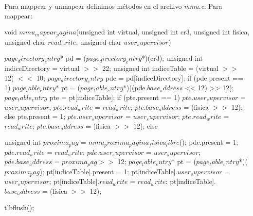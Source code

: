 Para mappear y unmapear definimos m\'etodos en el archivo \textit{mmu.c}.
Para mappear:
\begin{algorithmic}
    \State \tab void $mmu_mapear_pagina$(unsigned int virtual, unsigned int cr3, \State \tab unsigned int fisica, unsigned char $read_write$, unsigned char $user_supervisor$) {

  \State \tab \tab $page_directory_entry$* pd = ($page_directory_entry$*)(cr3);
  \State \tab \tab unsigned int indiceDirectory = virtual $>>$ 22;
  \State \tab \tab unsigned int indiceTable = (virtual $>>$ 12) $<<$ 10;
  \State \tab \tab $page_directory_entry$ pde = pd[indiceDirectory];
  \State \tab \tab if (pde.present == 1) {
    \State \tab \tab \tab $page_table_entry$* pt = ($page_table_entry$*)((pde.$base_address$ << 12) >> 12);
    \State \tab \tab \tab $page_table_entry$ pte = pt[indiceTable];
    \State \tab \tab \tab if (pte.present == 1) {
      \State \tab \tab \tab \tab $pte.user_supervisor$ = $user_supervisor$;
      \State \tab \tab \tab \tab $pte.read_write$ = $read_write$;
      \State \tab \tab \tab \tab $pte.base_address$ = (fisica $>>$ 12);
    \State \tab \tab \tab } else {
      \State \tab \tab \tab \tab pte.present = 1;
      \State \tab \tab \tab \tab $pte.user_supervisor$ = $user_supervisor$;
      \State \tab \tab \tab \tab $pte.read_write$ = $read_write$;
      \State \tab \tab \tab \tab $pte.base_address$ = (fisica $>>$ 12);
    \State \tab \tab \tab }
  \State \tab \tab } else {
    \State \tab \tab \tab unsigned int $proxima_pag$ = $mmu_proxima_pagina_fisica_libre$();
    \State \tab \tab \tab pde.present = 1;
    \State \tab \tab \tab $pde.read_write$ = $read_write$;
    \State \tab \tab \tab $pde.user_supervisor$ = $user_supervisor$;
    \State \tab \tab \tab $pde.base_address$ = $proxima_pag >>$ 12;
    \State \tab \tab \tab $page_table_entry$* pt = ($page_table_entry$*)($proxima_pag$);
    \State \tab \tab \tab pt[indiceTable].present = 1;
    \State \tab \tab \tab pt[indiceTable].$user_supervisor$ = $user_supervisor$;
    \State \tab \tab \tab pt[indiceTable].$read_write$ = $read_write$;
    \State \tab \tab \tab pt[indiceTable].$base_address$ = (fisica $>>$ 12);

\State \tab \tab  }

  \State \tab \tab tlbflush();
\State \tab }

    
    
\end{algorithmic}

